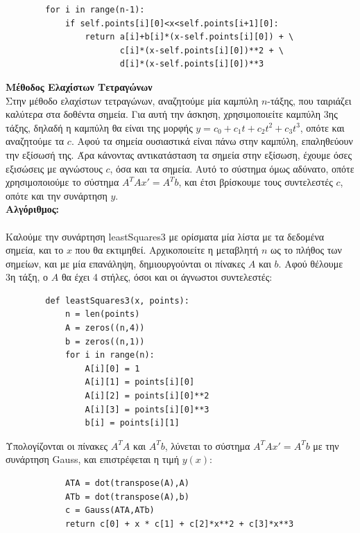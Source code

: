 \documentclass[a4paper,11pt]{article}
\newcommand{\lt}{\latintext}
\newcommand{\gt}{\greektext}
\begin{document}
{\begin{description}
    \lt
    \begin{verbatim}
        for i in range(n-1):
            if self.points[i][0]<x<self.points[i+1][0]:
                return a[i]+b[i]*(x-self.points[i][0]) + \
                       c[i]*(x-self.points[i][0])**2 + \
                       d[i]*(x-self.points[i][0])**3
    \end{verbatim}
    \gt
\item[γ)]{\textbf{ Μέθοδος Ελαχίστων Τετραγώνων}}\\
Στην μέθοδο ελαχίστων τετραγώνων, αναζητούμε μία καμπύλη $n$-τάξης, που ταιριάζει καλύτερα στα δοθέντα σημεία. Για αυτή την άσκηση, χρησιμοποιείτε καμπύλη 3ης τάξης, δηλαδή η καμπύλη θα είναι της μορφής $y = c_0 + c_1t + c_2t^2+c_3t^3$, οπότε και αναζητούμε τα $c$. Αφού τα σημεία ουσιαστικά είναι πάνω στην καμπύλη, επαληθεύουν την εξίσωσή της. Άρα κάνοντας αντικατάσταση τα σημεία στην εξίσωση, έχουμε όσες εξισώσεις με αγνώστους $c$, όσα και τα σημεία. Αυτό το σύστημα όμως αδύνατο, οπότε χρησιμοποιούμε το σύστημα $A^TAx' = A^Tb$, και έτσι βρίσκουμε τους συντελεστές $c$, οπότε και την συνάρτηση $y$.\\

    \textbf{Αλγόριθμος:}\\\\
Καλούμε την συνάρτηση {\lt leastSquares3} με ορίσματα μία λίστα με τα δεδομένα σημεία, και το $x$ που θα εκτιμηθεί. Αρχικοποιείτε η μεταβλητή $n$ ως το πλήθος των σημείων, και με μία επανάληψη, δημιουργούνται οι πίνακες $A$ και $b$. Αφού θέλουμε 3η τάξη, ο $A$ θα έχει 4 στήλες, όσοι και οι άγνωστοι συντελεστές:

    \lt
    \begin{verbatim}
        def leastSquares3(x, points):
            n = len(points)
            A = zeros((n,4))
            b = zeros((n,1)) 
            for i in range(n):
                A[i][0] = 1
                A[i][1] = points[i][0]
                A[i][2] = points[i][0]**2
                A[i][3] = points[i][0]**3
                b[i] = points[i][1]
    \end{verbatim}
    \gt
    
Υπολογίζονται οι πίνακες $A^TA$ και $A^Tb$, λύνεται το σύστημα $A^TAx' = A^Tb$ με την συνάρτηση {\lt Gauss}, και επιστρέφεται η τιμή $y(x)$:

    \lt
    \begin{verbatim}
            ATA = dot(transpose(A),A)
            ATb = dot(transpose(A),b)
            c = Gauss(ATA,ATb)
            return c[0] + x * c[1] + c[2]*x**2 + c[3]*x**3
    \end{verbatim}
    \gt


\end{description}}
\end{document}
